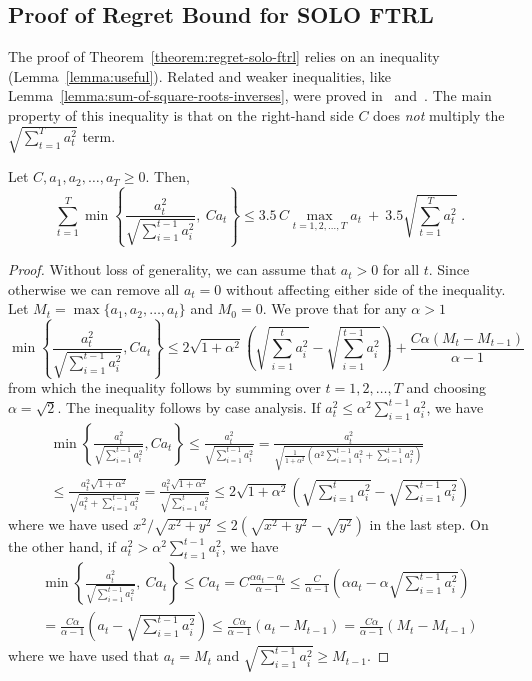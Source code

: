 \subsection{Proof of Regret Bound for \textsc{SOLO FTRL}}
\label{section:solo-ftrl-regret-bound}

The proof of Theorem~\ref{theorem:regret-solo-ftrl} relies on an inequality
(Lemma~\ref{lemma:useful}).  Related and weaker inequalities, like
Lemma~\ref{lemma:sum-of-square-roots-inverses}, were proved
in~\cite{Auer-Cesa-Bianchi-Gentile-2002} and~\cite{Jaksch-Ortner-Auer-2010}. The
main property of this inequality is that on the right-hand side $C$ does
\emph{not} multiply the $\sqrt{\sum_{t=1}^T a_t^2}$ term.

\begin{lemma}
\label{lemma:useful}
Let $C, a_1, a_2, \dots, a_T \ge 0$. Then,
$$
\sum_{t=1}^T \min \left\{ \frac{a_t^2}{\sqrt{\sum_{i=1}^{t-1} a_i^2}}, \ C a_t \right\}
\le 3.5 \, C \max_{t=1,2,\dots,T} a_t \ + \ 3.5 \sqrt{\sum_{t=1}^T a_t^2} \; .
$$
\end{lemma}
\begin{proof}
Without loss of generality, we can assume that $a_t > 0$ for all $t$. Since otherwise we
can remove all $a_t = 0$ without affecting either side of the inequality. Let $M_t = \max\{a_1, a_2, \dots, a_t\}$ and $M_0 = 0$.
We prove that for any $\alpha > 1$
$$
\min\left\{ \frac{a_t^2}{\sqrt{\sum_{i=1}^{t-1} a_i^2}}, C a_t \right\}
\le 2 \sqrt{1+\alpha^2} \left( \sqrt{\sum_{i=1}^t a_i^2} - \sqrt{\sum_{i=1}^{t-1} a_i^2} \right) + \frac{C\alpha( M_t  - M_{t-1})}{\alpha - 1}
$$
from which the inequality follows by summing over $t=1,2,\dots,T$ and choosing $\alpha = \sqrt{2}$.
The inequality follows by case analysis. If $a_t^2 \le \alpha^2 \sum_{i=1}^{t-1} a_i^2$, we have
\begin{multline*}
\min\left\{ \frac{a_t^2}{\sqrt{\sum_{i=1}^{t-1} a_i^2}}, C a_t \right\}
\le \frac{a_t^2}{\sqrt{\sum_{i=1}^{t-1} a_i^2}}
= \frac{a_t^2}{\sqrt{\frac{1}{1+\alpha^2} \left( \alpha^2 \sum_{i=1}^{t-1} a_i^2 + \sum_{i=1}^{t-1} a_i^2 \right)}} \\
\le \frac{a_t^2\sqrt{1+\alpha^2}}{\sqrt{ a_t^2 + \sum_{i=1}^{t-1} a_i^2 }}
= \frac{a_t^2\sqrt{1+\alpha^2}}{\sqrt{\sum_{i=1}^t a_i^2}}
\le 2\sqrt{1+\alpha^2} \left( \sqrt{\sum_{i=1}^t a_i^2} - \sqrt{\sum_{i=1}^{t-1} a_i^2} \right)
\end{multline*}
where we have used $x^2/\sqrt{x^2+y^2} \le 2(\sqrt{x^2+y^2} - \sqrt{y^2})$ in the last step.
On the other hand, if $a_t^2 > \alpha^2 \sum_{t=1}^{t-1} a_i^2$, we have
\begin{multline*}
\min\left\{ \frac{a_t^2}{\sqrt{\sum_{i=1}^{t-1} a_i^2}}, \ C a_t \right\}
\le C a_t
= C \frac{\alpha a_t  - a_t}{\alpha - 1}
\le \frac{C}{\alpha - 1} \left( \alpha a_t  - \alpha \sqrt{\sum_{i=1}^{t-1} a_i^2} \right) \\
= \frac{C\alpha}{\alpha - 1} \left( a_t  - \sqrt{\sum_{i=1}^{t-1} a_i^2} \right)
\le \frac{C\alpha}{\alpha - 1} \left( a_t  - M_{t-1} \right)
= \frac{C\alpha}{\alpha - 1} \left( M_t  - M_{t-1} \right)
\end{multline*}
where we have used that $a_t = M_t$ and $\sqrt{\sum_{i=1}^{t-1} a_i^2} \ge M_{t-1}$.
\end{proof}

